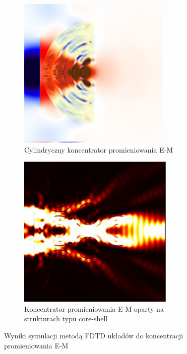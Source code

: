 \begin{figure}[!htb]
	\begin{subfigure}{.45\textwidth}
		\includegraphics[width=\textwidth]{images/multilayer/konc_polk_poynt.png}
		\caption{Cylindryczny koncentrator promieniowania E-M}
		\label{fig:concen-cyl}
	\end{subfigure}
	\begin{subfigure}{.45\textwidth}
		\includegraphics[width=\textwidth]{images/multilayer/konc_coreshell_energy.png}
		\caption{Koncentrator promieniowania E-M oparty na strukturach typu core-shell}
		\label{fig:concen-core-shell}
	\end{subfigure}

	\caption{Wyniki symulacji  metodą FDTD układów do koncentracji promieniowania E-M~\cite{pastuszczak2011slanted}} 
\end{figure}



